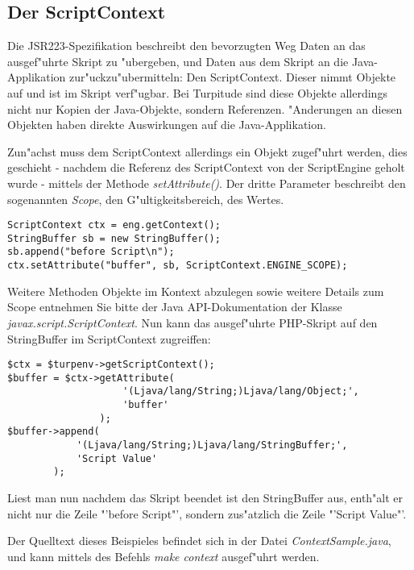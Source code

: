 \subsection{Der ScriptContext}
\label{sec:app1:context}

Die JSR223-Spezifikation beschreibt den bevorzugten Weg Daten an das ausgef"uhrte Skript zu
"ubergeben, und Daten aus dem Skript an die Java-Applikation zur"uckzu"ubermitteln: Den
ScriptContext. Dieser nimmt Objekte auf und ist im Skript verf"ugbar. Bei Turpitude sind diese
Objekte allerdings nicht nur Kopien der Java-Objekte, sondern Referenzen. "Anderungen an diesen
Objekten haben direkte Auswirkungen auf die Java-Applikation.

Zun"achst muss dem ScriptContext allerdings ein Objekt zugef"uhrt werden, dies geschieht 
- nachdem die Referenz des ScriptContext von der ScriptEngine geholt wurde - mittels
der Methode \emph{setAttribute()}. Der dritte Parameter beschreibt den sogenannten \emph{Scope},
den G"ultigkeitsbereich, des Wertes.
\begin{lstlisting}[caption=Kontext bef"ullen]
ScriptContext ctx = eng.getContext();
StringBuffer sb = new StringBuffer();
sb.append("before Script\n");
ctx.setAttribute("buffer", sb, ScriptContext.ENGINE_SCOPE);
\end{lstlisting}
Weitere Methoden Objekte im Kontext abzulegen sowie weitere Details zum Scope entnehmen Sie bitte 
der Java API-Dokumentation der Klasse \emph{javax.script.ScriptContext}.
Nun kann das ausgef"uhrte PHP-Skript auf den StringBuffer im ScriptContext zugreiffen:
\begin{lstlisting}[caption=Kontext in PHP]
$ctx = $turpenv->getScriptContext();
$buffer = $ctx->getAttribute(
                    '(Ljava/lang/String;)Ljava/lang/Object;', 
                    'buffer'
                );
$buffer->append(
            '(Ljava/lang/String;)Ljava/lang/StringBuffer;', 
            'Script Value'
        );
\end{lstlisting}
Liest man nun nachdem das Skript beendet ist den StringBuffer aus, enth"alt er nicht nur die
Zeile "'before Script"', sondern zus"atzlich die Zeile "'Script Value"'.

Der Quelltext dieses Beispieles befindet sich in der Datei \emph{ContextSample.java}, 
und kann mittels des Befehls \emph{make context} ausgef"uhrt werden.

